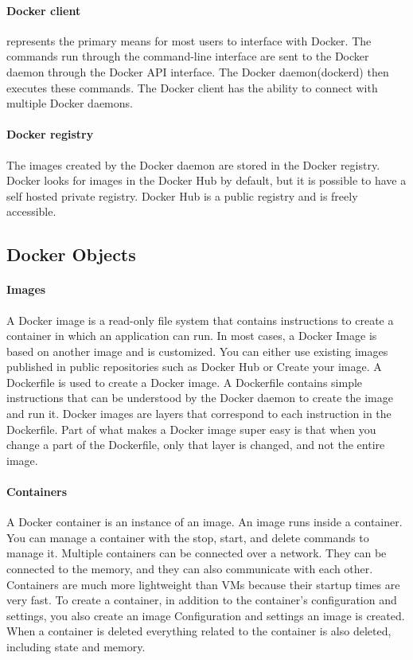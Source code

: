 		\paragraph{Docker client} represents the primary means for most users to interface with Docker. The commands run through the command-line interface are sent to the Docker daemon through the Docker API interface. The Docker daemon(dockerd) then executes these commands. The Docker client has the ability to connect with multiple Docker daemons.\cite[P.~32]{Kinnary2018}
		
		\paragraph{Docker registry} The images created by the Docker daemon are stored in the Docker registry. Docker looks for images in the Docker Hub by default, but it is possible to have a self hosted private registry. Docker Hub is a public registry and is freely accessible.\cite[P.~33]{Kinnary2018}
			
		\subsection{Docker Objects}
		\label{Grundlagen:Docker:Docker Objects}
		\paragraph{Images}
		A Docker image is a read-only file system that contains instructions to create a container in which an application can run. In most cases, a Docker Image is based on another image and is customized. You can either use existing images published in public repositories such as Docker Hub or Create your image.
		A Dockerfile is used to create a Docker image. A Dockerfile contains simple instructions that can be understood by the Docker daemon to	create the image and run it. Docker images are layers that correspond to each instruction in the Dockerfile. Part of what makes a Docker image super easy is that when you change a part of the Dockerfile, only that layer is changed, and not the entire image.

		\paragraph{Containers}
		A Docker container is an instance of an image. An image runs inside a container. You can manage a container with the stop, start, and delete commands to manage it. Multiple containers can be connected over a network. They can be connected to the memory, and they can also communicate with each other. Containers are much more lightweight than VMs because their startup times are very fast. To create a container, in addition to the container's configuration and settings, you also create an image Configuration and settings an image is created. When a container is deleted everything related to the container is also deleted, including state and memory.

